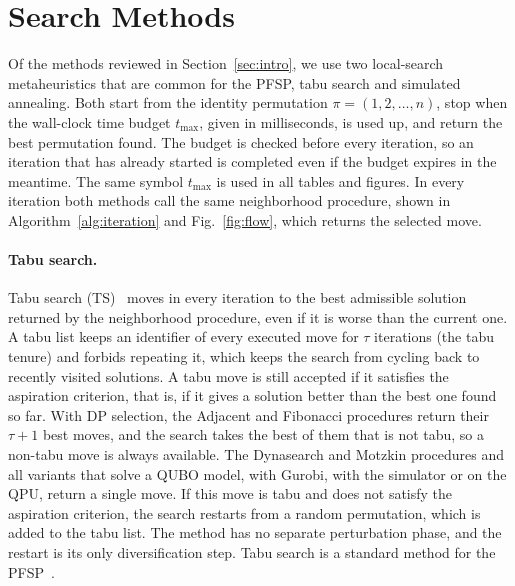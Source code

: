 \documentclass[10pt,twoside,twocolumn,a4paper]{article}
\newif\ifrevmarks \revmarksfalse
\newcommand{\rev}[1]{\ifrevmarks\textcolor{red}{#1}\else#1\fi}
\newenvironment{revblock}{\ifrevmarks\color{red}\fi}{}
\begin{document}
\section{\rev{Search Methods}}\label{sec:search}
\begin{revblock}
Of the methods reviewed in Section~\ref{sec:intro}, we use two local-search metaheuristics that are common for the PFSP, tabu search and simulated annealing. Both start from the identity permutation $\pi=(1,2,\dots,n)$, stop when the wall-clock time budget $t_{\max}$, given in milliseconds, is used up, and return the best permutation found. The budget is checked before every iteration, so an iteration that has already started is completed even if the budget expires in the meantime. The same symbol $t_{\max}$ is used in all tables and figures. In every iteration both methods call the same neighborhood procedure, shown in Algorithm~\ref{alg:iteration} and Fig.~\ref{fig:flow}, which returns the selected move.

\paragraph{Tabu search.}
Tabu search (TS)~\cite{glover1989tabu} moves in every iteration to the best admissible solution returned by the neighborhood procedure, even if it is worse than the current one. A tabu list keeps an identifier of every executed move for $\tau$ iterations (the tabu tenure) and forbids repeating it, which keeps the search from cycling back to recently visited solutions. A tabu move is still accepted if it satisfies the aspiration criterion, that is, if it gives a solution better than the best one found so far. With DP selection, the Adjacent and Fibonacci procedures return their $\tau+1$ best moves, and the search takes the best of them that is not tabu, so a non-tabu move is always available. The Dynasearch and Motzkin procedures and all variants that solve a QUBO model, with Gurobi, with the simulator or on the QPU, return a single move. If this move is tabu and does not satisfy the aspiration criterion, the search restarts from a random permutation, which is added to the tabu list. The method has no separate perturbation phase, and the restart is its only diversification step. Tabu search is a standard method for the PFSP~\cite{taillard1990some,NowickiSmutnicki1996,GrabowskiWodecki2004}.
\end{revblock}
\end{document}

